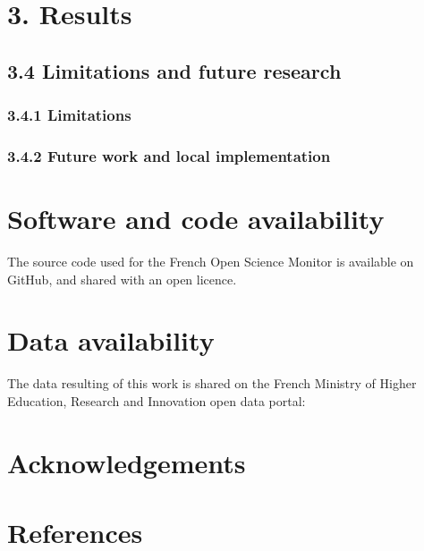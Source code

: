 \documentclass[
]{article}
\begin{document}
\hypertarget{results}{%
\section{3. Results}\label{results}}

\hypertarget{limitations-and-future-research}{%
\subsection{3.4 Limitations and future
research}\label{limitations-and-future-research}}

\hypertarget{limitations}{%
\subsubsection{3.4.1 Limitations}\label{limitations}}

\hypertarget{future-work-and-local-implementation}{%
\subsubsection{3.4.2 Future work and local
implementation}\label{future-work-and-local-implementation}}

\hypertarget{software-and-code-availability}{%
\section{Software and code
availability}\label{software-and-code-availability}}

The source code used for the French Open Science Monitor is available on
GitHub, and shared with an open licence.

\hypertarget{data-availability}{%
\section{Data availability}\label{data-availability}}

The data resulting of this work is shared on the French Ministry of
Higher Education, Research and Innovation open data portal:

\hypertarget{acknowledgements}{%
\section{Acknowledgements}\label{acknowledgements}}

\hypertarget{references}{%
\section*{References}\label{references}}
\end{document}
